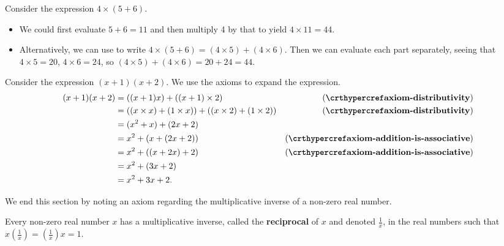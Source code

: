\begin{example}
    Consider the expression $4\times(5+6)$.
    \begin{itemize}
        \item We could first evaluate $5+6=11$ and then multiply 4 by that to yield $4\times11=44$.
        \item Alternatively, we can use  to write $4\times(5+6) = (4\times5)+(4\times6)$. Then we can evaluate each part separately, seeing that $4\times5 = 20$, $4\times6 = 24$, so $(4\times5)+(4\times6) = 20+24=44$.
    \end{itemize}
\end{example}
\begin{example}
    Consider the expression $(x+1)(x+2)$. We use the axioms to expand the expression.
    \begin{align*}
        (x+1)(x+2) &= ((x+1)x) + ((x+1)\times2) & (\myref{axiom-distributivity})\\
        &= ((x\times x) + (1\times x)) + ((x\times2) + (1\times2)) & (\myref{axiom-distributivity})\\
        &= (x^2+x) + (2x+2)\\
        &= x^2+(x + (2x+2)) & (\myref{axiom-addition-is-associative})\\
        &= x^2+((x + 2x)+2) & (\myref{axiom-addition-is-associative})\\
        &= x^2 + (3x+2)\\
        &= x^2 + 3x + 2.
    \end{align*}
\end{example}

We end this section by noting an axiom regarding the multiplicative inverse of a non-zero real number.
\begin{axiom}\label{axiom-reciprocal}
    Every non-zero real number $x$ has a multiplicative inverse, called the \textbf{reciprocal} of $x$ and denoted $\frac1x$, in the real numbers such that $x\left(\frac1x\right) = \left(\frac1x\right)x = 1$.
\end{axiom}

